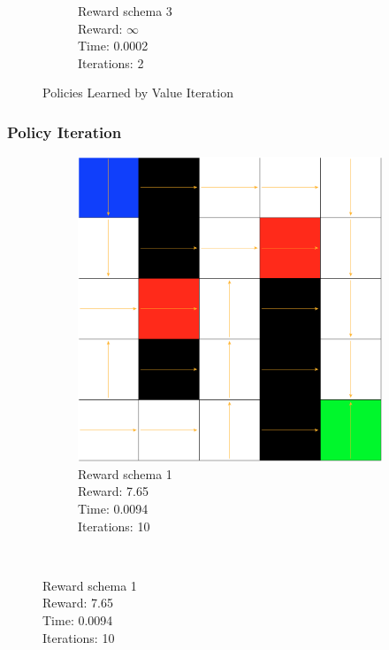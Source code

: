 \documentclass[a4paper,10pt]{article}
\begin{document}
\begin{figure}[h!]
\begin{subfigure}[b]{0.3\textwidth}
                \caption{Reward schema 3\\
                Reward: $\infty$  \\
                Time:  0.0002\\
                Iterations: 2}
                \label{fig:mouse}
        \end{subfigure}
        \caption{Policies Learned by Value Iteration}\label{fig:animals}
\end{figure}

\subsubsection{Policy Iteration}
\begin{figure}[h!]
        \centering
        \begin{subfigure}[b]{0.3\textwidth}
                \includegraphics[width=\textwidth]{figures/5x5_piter_r1.png}
                \caption{Reward schema 1\\
                Reward:  7.65 \\
                Time:  0.0094\\
                Iterations: 10 }
                \label{fig:gull}
        \end{subfigure}%
        ~ %

\end{figure}
\end{document}
